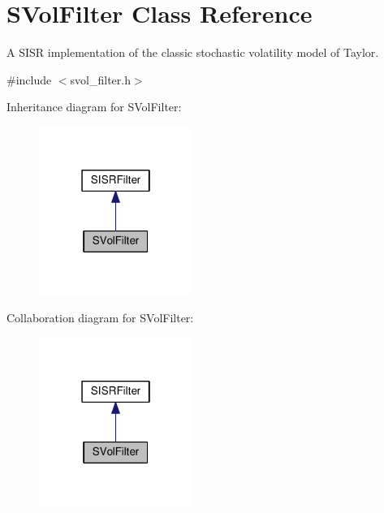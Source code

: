 \hypertarget{classSVolFilter}{}\section{S\+Vol\+Filter Class Reference}
\label{classSVolFilter}


A S\+I\+SR implementation of the classic stochastic volatility model of Taylor.  




{\ttfamily \#include $<$svol\+\_\+filter.\+h$>$}



Inheritance diagram for S\+Vol\+Filter\+:\nopagebreak
\begin{figure}[H]
\begin{center}
\leavevmode
\includegraphics[width=142pt]{classSVolFilter__inherit__graph}
\end{center}
\end{figure}


Collaboration diagram for S\+Vol\+Filter\+:\nopagebreak
\begin{figure}[H]
\begin{center}
\leavevmode
\includegraphics[width=142pt]{classSVolFilter__coll__graph}
\end{center}
\end{figure}
